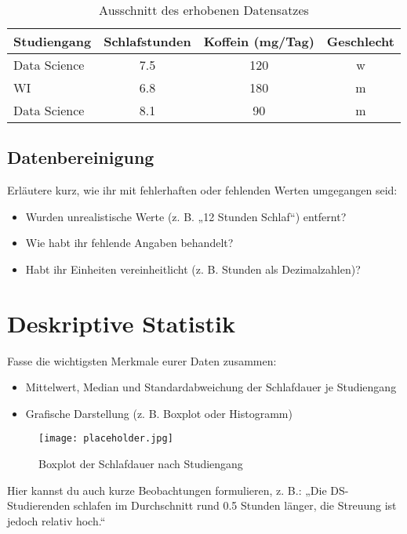 \documentclass[12pt,a4paper]{article}
\begin{document}
\begin{table}[h!]
  \centering
  \caption{Ausschnitt des erhobenen Datensatzes}
  \begin{tabular}{lccc}
  \toprule
  \textbf{Studiengang} & \textbf{Schlafstunden} & \textbf{Koffein (mg/Tag)} & \textbf{Geschlecht}\\
  \midrule
  Data Science & 7.5 & 120 & w \\
  WI & 6.8 & 180 & m \\
  Data Science & 8.1 & 90 & m \\
  \bottomrule
  \end{tabular}
\end{table}

\subsection{Datenbereinigung}

Erläutere kurz, wie ihr mit fehlerhaften oder fehlenden Werten umgegangen seid:
\begin{itemize}
  \item Wurden unrealistische Werte (z. B. „12 Stunden Schlaf“) entfernt?
  \item Wie habt ihr fehlende Angaben behandelt?
  \item Habt ihr Einheiten vereinheitlicht (z. B. Stunden als Dezimalzahlen)?
\end{itemize}

\section{Deskriptive Statistik}

Fasse die wichtigsten Merkmale eurer Daten zusammen:
\begin{itemize}
  \item Mittelwert, Median und Standardabweichung der Schlafdauer je Studiengang
  \item Grafische Darstellung (z. B. Boxplot oder Histogramm)
\end{itemize}

\begin{figure}[h!]
  \centering
  \texttt{[image: placeholder.jpg]}
  \caption{Boxplot der Schlafdauer nach Studiengang}
\end{figure}

Hier kannst du auch kurze Beobachtungen formulieren, z. B.:  
„Die DS-Studierenden schlafen im Durchschnitt rund 0.5 Stunden länger, die Streuung ist jedoch relativ hoch.“
\end{document}
